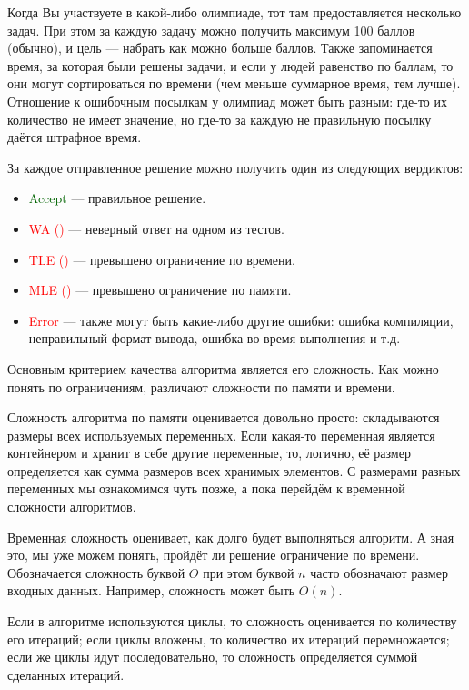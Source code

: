 Когда Вы участвуете в какой-либо олимпиаде, тот там предоставляется несколько задач. При этом за каждую задачу можно получить максимум 100 баллов (обычно), и цель — набрать как можно больше баллов. Также запоминается время, за которая были решены задачи, и если у людей равенство по баллам, то они могут сортироваться по времени (чем меньше суммарное время, тем лучше). Отношение к ошибочным посылкам у олимпиад может быть разным: где-то их количество не имеет значение, но где-то за каждую не правильную посылку даётся штрафное время.

За каждое отправленное решение можно получить один из следующих вердиктов:
\begin{itemize}
    \item \textcolor{darkgreen}{Accept} — правильное решение.
    \item \textcolor{red}{WA ()} — неверный ответ на одном из тестов.
    \item \textcolor{red}{TLE ()} — превышено ограничение по времени.
    \item \textcolor{red}{MLE ()} — превышено ограничение по памяти.
    \item \textcolor{red}{Error} — также могут быть какие-либо другие ошибки: ошибка компиляции, неправильный формат вывода, ошибка во время выполнения и т.д.
\end{itemize}

Основным критерием качества алгоритма является его сложность. Как можно понять по ограничениям, различают сложности по памяти и времени.

Сложность алгоритма по памяти оценивается довольно просто: складываются размеры всех используемых переменных. Если какая-то переменная является контейнером и хранит в себе другие переменные, то, логично, её размер определяется как сумма размеров всех хранимых элементов. С размерами разных переменных мы ознакомимся чуть позже, а пока перейдём к временной сложности алгоритмов.

Временная сложность оценивает, как долго будет выполняться алгоритм. А зная это, мы уже можем понять, пройдёт ли решение ограничение по времени. Обозначается сложность буквой $O$ при этом буквой $n$ часто обозначают размер входных данных. Например, сложность может быть $O(n)$.

Если в алгоритме используются циклы, то сложность оценивается по количеству его итераций; если циклы вложены, то количество их итераций перемножается; если же циклы идут последовательно, то сложность определяется суммой сделанных итераций.

